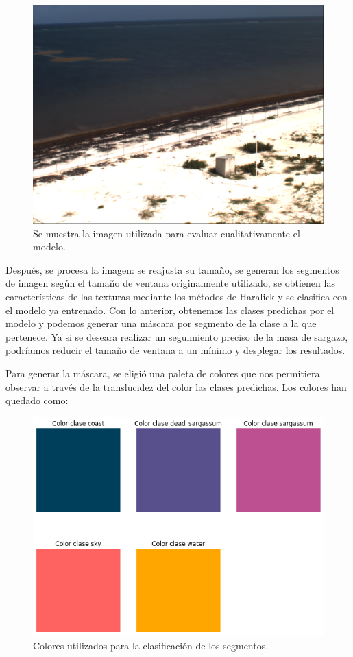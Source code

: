 \documentclass[conference]{IEEEtran}
\begin{document}
\begin{figure}[H]
    \centering
    \includegraphics[scale=0.13]{imgs/eval.png}
    \caption{Se muestra la imagen utilizada para evaluar cualitativamente el modelo.}
\end{figure}

Después, se procesa la imagen: se reajusta su tamaño, se generan los segmentos de imagen según el tamaño de ventana originalmente utilizado, se obtienen las características de las texturas mediante los métodos de Haralick y se clasifica con el modelo ya entrenado. Con lo anterior, obtenemos las clases predichas por el modelo y podemos generar una máscara por segmento de la clase a la que pertenece. Ya si se deseara realizar un seguimiento preciso de la masa de sargazo, podríamos reducir el tamaño de ventana a un mínimo y desplegar los resultados.

Para generar la máscara, se eligió una paleta de colores que nos permitiera observar a través de la translucidez del color las clases predichas. Los colores han quedado como:

\begin{figure}[H]
    \centering
    \includegraphics[scale=0.3]{imgs/color_classes.png}
    \caption{Colores utilizados para la clasificación de los segmentos.}
\end{figure}
\end{document}
